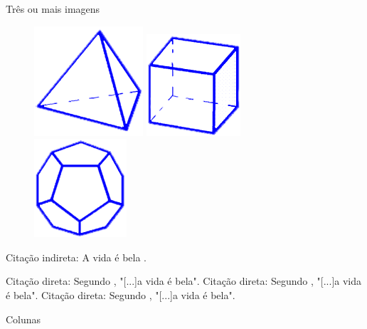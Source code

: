 \documentclass[aspectratio=169,xcolor=dvipsnames]{beamer}
\begin{document}
\begin{frame}{Três ou mais imagens}
    \begin{figure}
        \includegraphics[width=0.2\linewidth]{img/img_01.png} \hspace{1cm}
        \includegraphics[width=0.2\linewidth]{img/img_02.png} \hspace{1cm}
        \includegraphics[width=0.2\linewidth]{img/img_03.png}
    \end{figure}
    Citação indireta: A vida é bela \citep{p1}.

    Citação direta: Segundo \citet{p1}, "[...]a vida é bela".
    Citação direta: Segundo \citet{p2}, "[...]a vida é bela".
    Citação direta: Segundo \citet{p3}, "[...]a vida é bela".
\end{frame}

\begin{frame}{Colunas}
    \begin{columns}

        \begin{column}{0.48\textwidth}
            \lipsum[2-2]
        \end{column}
        
        \hspace{-10pt}
        \vrule{}

        \begin{column}{0.48\textwidth}
            \lipsum[2-2]
        \end{column}

    \end{columns}
\end{frame}
\end{document}
